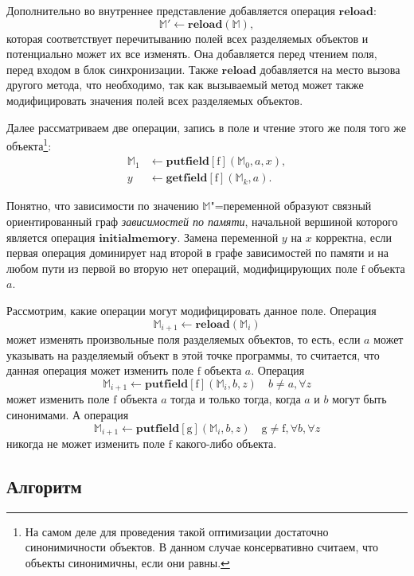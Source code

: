 \documentclass[14pt,titlepage,draft]{extarticle}
\newcommand{\M}{\ensuremath{\mathbb{M}}}
\newcommand{\field}[1]{\mathrm{#1}}
\newcommand{\op}[1]{\mathbf{#1}}
\begin{document}
    Дополнительно во внутреннее представление добавляется операция
    $\op{reload}$:
    \[ \M' \gets \op{reload}(\M), \]
    которая соответствует перечитыванию полей всех разделяемых объектов и
    потенциально может их все изменять.
    Она добавляется перед чтением  поля, перед входом в блок
    синхронизации. Также $\op{reload}$ добавляется на место вызова другого
    метода, что необходимо, так как вызываемый метод может также модифицировать
    значения полей всех разделяемых объектов.

    Далее рассматриваем две операции, запись в поле и чтение этого же поля того
    же объекта\footnote{
      На самом деле для проведения такой оптимизации достаточно синонимичности
      объектов. В данном случае консервативно считаем, что объекты
      синонимичны, если они равны.
    }:
    \begin{align*}
      \M_1 &\gets \op{putfield}[\field{f}](\M_0, a, x), \\
      y &\gets \op{getfield}[\field{f}](\M_k, a).
    \end{align*}

    Понятно, что зависимости по значению \M"=переменной образуют связный
    ориентированный граф \emph{зависимостей по памяти}, начальной вершиной
    которого является операция $\op{initialmemory}$.
    Замена переменной $y$ на $x$ корректна, если первая операция доминирует над
    второй в графе зависимостей по памяти и на любом пути из первой во
    вторую нет операций, модифицирующих поле $\field{f}$ объекта $a$.

    Рассмотрим, какие операции могут модифицировать данное поле.
    Операция \[\M_{i+1} \gets \op{reload}(\M_i)\] может изменять произвольные
    поля разделяемых объектов, то есть, если $a$ может указывать на разделяемый
    объект в этой точке программы, то считается, что данная операция может
    изменить поле $\field{f}$ объекта $a$.
    Операция
    \[\M_{i+1} \gets \op{putfield}[\field{f}](\M_i, b, z)
      \quad b \neq a, \forall z\]
    может изменить поле $\field{f}$ объекта $a$ тогда и только тогда, когда
    $a$ и $b$ могут быть синонимами.
    А операция
    \[\M_{i+1} \gets \op{putfield}[\field{g}](\M_i, b, z)
      \quad \field{g} \neq \field{f}, \forall b, \forall z\]
    никогда не может изменить поле $\field{f}$ какого-либо объекта.

  \subsection{Алгоритм}
\end{document}
